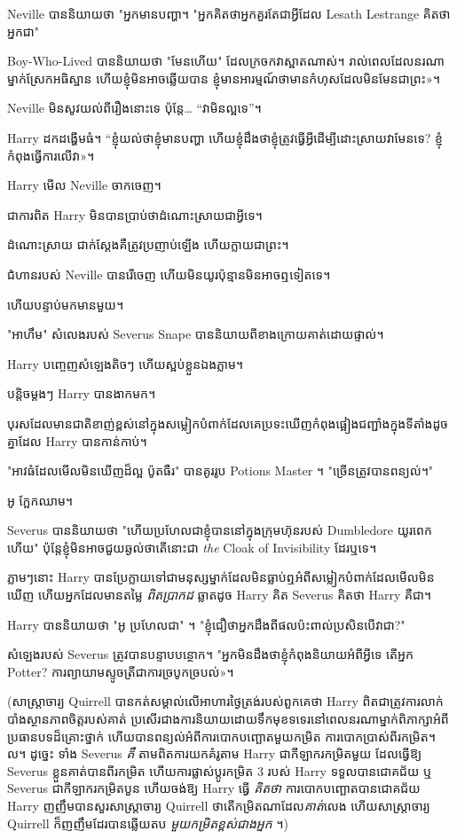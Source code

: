 {{{{{Neville បាននិយាយថា "អ្នកមានបញ្ហា។ "អ្នកគិតថាអ្នកគួរតែជាអ្វីដែល Lesath Lestrange គិតថាអ្នកជា"

Boy-Who-Lived បាននិយាយថា "មែនហើយ" ដែលក្រចកវាស្អាតណាស់។ រាល់​ពេល​ដែល​នរណា​ម្នាក់​ស្រែក​អធិស្ឋាន ហើយ​ខ្ញុំ​មិន​អាច​ឆ្លើយ​បាន ខ្ញុំ​មាន​អារម្មណ៍​ថា​មាន​កំហុស​ដែល​មិន​មែន​ជា​ព្រះ»។

Neville មិន​សូវ​យល់​ពី​រឿង​នោះ​ទេ ប៉ុន្តែ… “វា​មិន​ល្អ​ទេ”។

Harry ដកដង្ហើមធំ។ “ខ្ញុំយល់ថាខ្ញុំមានបញ្ហា ហើយខ្ញុំដឹងថាខ្ញុំត្រូវធ្វើអ្វីដើម្បីដោះស្រាយវាមែនទេ? ខ្ញុំ​កំពុង​ធ្វើ​ការ​លើ​វា»។

\later

Harry មើល Neville ចាកចេញ។

ជាការពិត Harry មិនបានប្រាប់ថាដំណោះស្រាយជាអ្វីទេ។

ដំណោះស្រាយ ជាក់ស្តែងគឺត្រូវប្រញាប់ឡើង ហើយក្លាយជាព្រះ។

ជំហាន​របស់ Neville បាន​រើ​ចេញ ហើយ​មិន​យូរ​ប៉ុន្មាន​មិន​អាច​ឮ​ទៀត​ទេ។

ហើយបន្ទាប់មកមានមួយ។

"អាហឹម" សំលេងរបស់ Severus Snape បាននិយាយពីខាងក្រោយគាត់ដោយផ្ទាល់។

Harry បញ្ចេញ​សំឡេង​តិចៗ ហើយ​ស្អប់​ខ្លួន​ឯង​ភ្លាម។

បន្តិចម្ដងៗ Harry បានងាកមក។

បុរសដែលមានជាតិខាញ់ខ្ពស់នៅក្នុងសម្លៀកបំពាក់ដែលគេប្រទះឃើញកំពុងផ្អៀងជញ្ជាំងក្នុងទីតាំងដូចគ្នាដែល Harry បានកាន់កាប់។

"អាវធំដែលមើលមិនឃើញដ៏ល្អ ប៉ូតធឺរ" បានគូររូប Potions Master ។ "ច្រើនត្រូវបានពន្យល់។"

អូ ក្អែកឈាម។

Severus បាននិយាយថា "ហើយប្រហែលជាខ្ញុំបាននៅក្នុងក្រុមហ៊ុនរបស់ Dumbledore យូរពេកហើយ" ប៉ុន្តែខ្ញុំមិនអាចជួយឆ្ងល់ថាតើនោះជា \emph{the} Cloak of Invisibility ដែរឬទេ។

ភ្លាមៗនោះ Harry បានប្រែក្លាយទៅជាមនុស្សម្នាក់ដែលមិនធ្លាប់ឮអំពីសម្លៀកបំពាក់ដែលមើលមិនឃើញ ហើយអ្នកដែលមានតម្លៃ \emph{ពិតប្រាកដ} ឆ្លាតដូច Harry គិត Severus គិតថា Harry គឺជា។

Harry បាននិយាយថា "អូ ប្រហែលជា" ។ "ខ្ញុំជឿថាអ្នកដឹងពីផលប៉ះពាល់ប្រសិនបើវាជា?"

សំឡេងរបស់ Severus ត្រូវបានបន្ទាបបន្ថោក។ "អ្នកមិនដឹងថាខ្ញុំកំពុងនិយាយអំពីអ្វីទេ តើអ្នក Potter? ការ​ព្យាយាម​ស្ទូច​ត្រី​ជា​ការ​ច្របូកច្របល់»។

(សាស្រ្តាចារ្យ Quirrell បានកត់សម្គាល់លើអាហារថ្ងៃត្រង់របស់ពួកគេថា Harry ពិតជាត្រូវការលាក់បាំងស្ថានភាពចិត្តរបស់គាត់ ប្រសើរជាងការនិយាយដោយទឹកមុខទទេរនៅពេលនរណាម្នាក់ពិភាក្សាអំពីប្រធានបទដ៏គ្រោះថ្នាក់ ហើយបានពន្យល់អំពីការបោកបញ្ឆោតមួយកម្រិត ការបោកប្រាស់ពីរកម្រិត។ល។ ដូច្នេះ ទាំង Severus \emph{គឺ} តាម​ពិត​ការ​យក​គំរូ​តាម Harry ជា​កីឡាករ​កម្រិត​មួយ ដែល​ធ្វើ​ឱ្យ Severus ខ្លួន​គាត់​បាន​ពីរ​កម្រិត ហើយ​ការ​ផ្លាស់​ប្តូរ​កម្រិត 3 របស់ Harry ទទួល​បាន​ជោគជ័យ ឬ Severus ជា​កីឡាករ​កម្រិត​បួន ហើយ​ចង់​ឱ្យ Harry ធ្វើ \emph{គិតថា} ការបោកបញ្ឆោតបានជោគជ័យ Harry ញញឹមបានសួរសាស្រ្តាចារ្យ Quirrell ថាតើកម្រិតណាដែល\emph{គាត់}លេង ហើយសាស្រ្តាចារ្យ Quirrell ក៏ញញឹមដែរបានឆ្លើយតប \emph{មួយកម្រិតខ្ពស់ជាងអ្នក }។)

}}}}}
